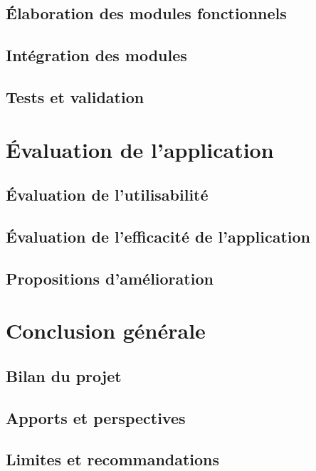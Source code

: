 \documentclass[12pt, a4paper]{report}
\begin{document}
    \section{Élaboration des modules fonctionnels}\label{sec:elaboration-des-modules-fonctionnels}
    \section{Intégration des modules}\label{sec:integration-des-modules}
    \section{Tests et validation}\label{sec:tests-et-validation}

    \chapter{Évaluation de l'application}\label{cha:evaluation-de-l-application}
    \section{Évaluation de l'utilisabilité}\label{sec:evaluation-de-l-utilisabilite}
    \section{Évaluation de l'efficacité de l'application}\label{sec:evaluation-de-l-efficacite-de-l-application}
    \section{Propositions d'amélioration}\label{sec:propositions-d-amelioration}

    \chapter*{Conclusion générale}\label{cha:conclusion-generale}
    \section{Bilan du projet}\label{sec:bilan-du-projet}
    \section{Apports et perspectives}\label{sec:apports-et-perspectives}
    \section{Limites et recommandations}\label{sec:limites-et-recommandations}
    
\end{document}
